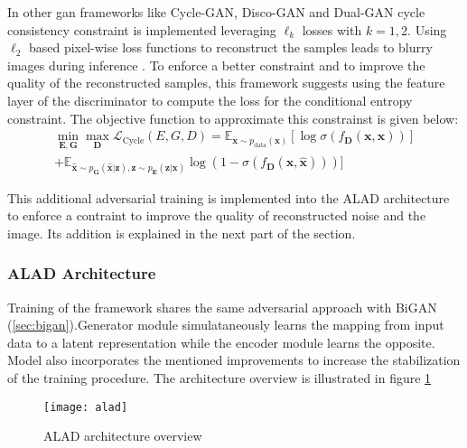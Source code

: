 In other gan frameworks like Cycle-GAN\cite{Zhu2017UnpairedIT}, Disco-GAN \cite{Kim2017LearningTD}
and Dual-GAN \cite{Yi2017DualGANUD} cycle consistency constraint is implemented leveraging
$\ell_{k}$ losses with $k=1,2$. Using $\ell_2$ based pixel-wise loss functions to reconstruct the samples
leads to blurry images during inference \cite{Larsen2016AutoencodingBP}\cite{Li2017TowardsUA}.
To enforce a better constraint and to improve the quality of the reconstructed samples, this
framework suggests using the feature layer of the discriminator to compute the loss for the
conditional entropy constraint. The objective function to approximate this constrainst is given
below:
\begin{multline}
    \label{eqn:alice}
     \min _{\boldsymbol{E}, \boldsymbol{G}} \max _{\boldsymbol{D}}
\mathcal{L}_{\mathrm{Cycle}}(E,G,D)
=\mathbb{E}_{\boldsymbol{x} \sim p_{\text{data}}(\boldsymbol{x})}\left[\log
\sigma\left(f_{\boldsymbol{D}}(\boldsymbol{x}, \boldsymbol{x})\right)\right] \\
+\mathbb{E}_{\hat{\boldsymbol{x}} \sim p_{\boldsymbol{G}}(\hat{\boldsymbol{x}} | \boldsymbol{z}),
\boldsymbol{z} \sim p_{\boldsymbol{E}}(\boldsymbol{z} | \boldsymbol{x})} \log
\left(1-\sigma\left(f_{\boldsymbol{D}}(\boldsymbol{x}, \hat{\boldsymbol{x}})\right)\right) ] 
\end{multline}

This additional adversarial training is implemented into the ALAD architecture to enforce a
contraint to improve the quality of reconstructed noise and the image. Its addition is explained in
the next part of the section. 

\subsubsection{ALAD Architecture}
\label{sec:alad_arc}

Training of the framework shares the same adversarial approach with BiGAN
(\ref{sec:bigan}).Generator module simulataneously learns the mapping from input data to a latent
representation while the encoder module learns the opposite. Model also incorporates the mentioned
improvements to increase the stabilization of the training procedure.  The architecture overview is
illustrated in figure \ref{fig:alad_model}

\begin{figure}[h!]
	\centering
	\texttt{[image: alad]}
    \caption{ALAD architecture overview}
    \label{fig:alad_model}
\end{figure}



